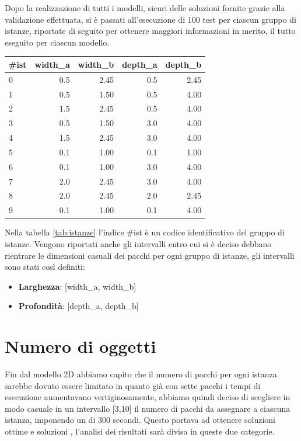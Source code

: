 Dopo la realizzazione di tutti i modelli, sicuri delle soluzioni fornite grazie alla validazione effettuata, si è passati all'esecuzione di 100 test per ciascun gruppo di istanze, riportate di seguito per ottenere maggiori informazioni in merito, il tutto eseguito per ciascun modello.
\begin{center}
	\begin{tabular}{lrrrr}
		\toprule
		{}
		\#ist & width\_a & width\_b & depth\_a & depth\_b \\
		\midrule
		0     & 0.5      & 2.45     & 0.5      & 2.45     \\
		1     & 0.5      & 1.50     & 0.5      & 4.00     \\
		2     & 1.5      & 2.45     & 0.5      & 4.00     \\
		3     & 0.5      & 1.50     & 3.0      & 4.00     \\
		4     & 1.5      & 2.45     & 3.0      & 4.00     \\
		5     & 0.1      & 1.00     & 0.1      & 1.00     \\
		6     & 0.1      & 1.00     & 3.0      & 4.00     \\
		7     & 2.0      & 2.45     & 3.0      & 4.00     \\
		8     & 2.0      & 2.45     & 2.0      & 2.45     \\
		9     & 0.1      & 1.00     & 0.1      & 4.00     \\
		\bottomrule
	\end{tabular}
	\label{tab:istanze}
\end{center}

Nella tabella \ref{tab:istanze} l'indice \#ist è un codice identificativo del gruppo di istanze. Vengono riportati anche gli intervalli entro cui si è deciso debbano rientrare le dimensioni casuali dei pacchi per ogni gruppo di istanze, gli intervalli sono stati così definiti:
\begin{itemize}
	\item \textbf{Larghezza}: [width\_a, width\_b]
	\item \textbf{Profondità}: [depth\_a, depth\_b]
\end{itemize}

\section{Numero di oggetti}
Fin dal modello 2D abbiamo capito che il numero di pacchi per ogni istanza sarebbe dovuto essere limitato in quanto già con sette pacchi i tempi di esecuzione aumentavano vertiginosamente, abbiamo quindi deciso di scegliere in modo casuale in un intervallo [3,10] il numero di pacchi da assegnare a ciascuna istanza, imponendo un  di 300 secondi.
Questo portava ad ottenere soluzioni ottime e soluzioni , l'analisi dei risultati sarà divisa in queste due categorie.

